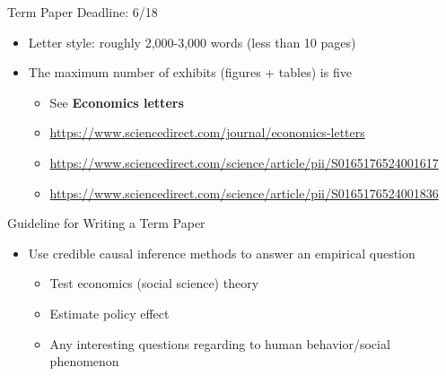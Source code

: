 \documentclass[dvipsnames,hyperref={pdfpagelabels=false}]{beamer}
\begin{document}
\begin{frame}{Term Paper Deadline: 6/18}
\begin{itemize}
	
\item Letter style: roughly 2,000-3,000 words (less than 10 pages)
\vspace{0.3cm}
\item The maximum number of exhibits (figures + tables) is five
\vspace{0.3cm}
\begin{itemize} 
	\item See \textbf{Economics letters}
	\vspace{0.3cm}
	\item \url{https://www.sciencedirect.com/journal/economics-letters}
		\vspace{0.3cm}
	\item \url{https://www.sciencedirect.com/science/article/pii/S0165176524001617}
	
			\vspace{0.3cm}
	
	\item \url{https://www.sciencedirect.com/science/article/pii/S0165176524001836}
	
\end{itemize}
\vspace{0.3cm}
	
\end{itemize}
\end{frame}



\begin{frame}{Guideline for Writing a Term Paper}
\begin{itemize} 
	
	\item Use credible causal inference methods to answer an empirical question
	\vspace{0.3cm}
	\begin{itemize} 
		\item Test economics (social science) theory
		\vspace{0.3cm}
		\item Estimate policy effect
		\vspace{0.3cm}
		\item Any interesting questions regarding to human behavior/social phenomenon
	\end{itemize}
	
	
\end{itemize}
\end{frame}
\end{document}
